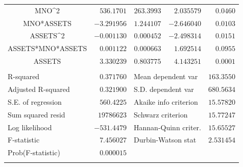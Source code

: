 \documentclass[12pt]{report}
\begin{document}
\begin{table}[H]
\begin{tabular}{lrrrr}
		\multicolumn{1}{c}{MNO\textasciicircum 2}&\multicolumn{1}{r}{$536.1701$}&\multicolumn{1}{r}{$263.3993$}&\multicolumn{1}{r}{$2.035579$}&\multicolumn{1}{r}{$0.0460$}\\
		\multicolumn{1}{c}{MNO*ASSETS}&\multicolumn{1}{r}{$-3.291956$}&\multicolumn{1}{r}{$1.244107$}&\multicolumn{1}{r}{$-2.646040$}&\multicolumn{1}{r}{$0.0103$}\\
		\multicolumn{1}{c}{ASSETS\textasciicircum 2}&\multicolumn{1}{r}{$-0.001130$}&\multicolumn{1}{r}{$0.000452$}&\multicolumn{1}{r}{$-2.498314$}&\multicolumn{1}{r}{$0.0151$}\\
		\multicolumn{1}{c}{ASSETS*MNO*ASSETS}&\multicolumn{1}{r}{$0.001122$}&\multicolumn{1}{r}{$0.000663$}&\multicolumn{1}{r}{$1.692514$}&\multicolumn{1}{r}{$0.0955$}\\
		\multicolumn{1}{c}{ASSETS}&\multicolumn{1}{r}{$3.330239$}&\multicolumn{1}{r}{$0.803775$}&\multicolumn{1}{r}{$4.143251$}&\multicolumn{1}{r}{$0.0001$}\\
		[4.5pt] \hline \\ [-4.5pt]
		\multicolumn{1}{l}{R-squared}&\multicolumn{1}{r}{$0.371760$}&\multicolumn{2}{l}{Mean dependent var}&\multicolumn{1}{r}{$163.3550$}\\
		\multicolumn{1}{l}{Adjusted R-squared}&\multicolumn{1}{r}{$0.321900$}&\multicolumn{2}{l}{S.D. dependent var}&\multicolumn{1}{r}{$680.5634$}\\
		\multicolumn{1}{l}{S.E. of regression}&\multicolumn{1}{r}{$560.4225$}&\multicolumn{2}{l}{Akaike info criterion}&\multicolumn{1}{r}{$15.57820$}\\
		\multicolumn{1}{l}{Sum squared resid}&\multicolumn{1}{r}{$19786623$}&\multicolumn{2}{l}{Schwarz criterion}&\multicolumn{1}{r}{$15.77247$}\\
		\multicolumn{1}{l}{Log likelihood}&\multicolumn{1}{r}{$-531.4479$}&\multicolumn{2}{l}{Hannan-Quinn criter.}&\multicolumn{1}{r}{$15.65527$}\\
		\multicolumn{1}{l}{F-statistic}&\multicolumn{1}{r}{$7.456027$}&\multicolumn{2}{l}{Durbin-Watson stat}&\multicolumn{1}{r}{$2.531454$}\\
		\multicolumn{1}{l}{Prob(F-statistic)}&\multicolumn{1}{r}{$0.000015$}&\multicolumn{1}{c}{}&\multicolumn{1}{c}{}&\multicolumn{1}{c}{}\\
		[4.5pt] \hline \\ [-4.5pt]
	\end{tabular}
\end{table}
\end{document}
